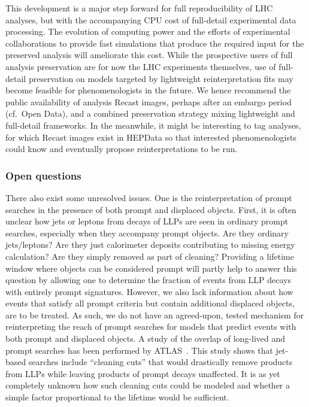 \documentclass[a4paper,aps,prd,longbibliography,notitlepage,showpacs,amsmath,amssymb,superscriptaddress,nofootinbib,floatfix,11pt,preprintnumbers]{revtex4-1-mod}
\newcommand{\hepdata}{\textsf{HEPData}\xspace}
\newcommand{\recast}{\textsf{Recast}\xspace}
\newcommand{\cf}{cf.\xspace}
\begin{document}
This development is a major step forward for full reproducibility of LHC analyses, but with the accompanying CPU cost of full-detail experimental data processing. The evolution of computing power and the efforts of experimental collaborations to provide fast simulations that produce the required input for the preserved analysis will ameliorate this cost. While the prospective users of full analysis preservation are for now the LHC experiments themselves, use of full-detail preservation on models targeted by lightweight reinterpretation fits may become feasible for phenomenologists in the future. We hence recommend the public availability of analysis \recast images, perhaps after an embargo period (\cf~Open Data), and a combined preservation strategy mixing lightweight and full-detail frameworks.
In the meanwhile, it might be interesting to tag analyses, for which \recast images exist in \hepdata so that interested phenomenologists could know and eventually propose reinterpretations to be run.


\subsubsection{Open questions \label{sec:openquestions}}

There also exist some unresolved issues.
One is the reinterpretation of prompt searches in the presence of both prompt and displaced objects.
First, it is often unclear how jets or leptons from decays of LLPs are seen in ordinary prompt searches, especially when they accompany prompt objects. Are they ordinary jets/leptons? Are they just calorimeter deposits contributing to missing energy calculation? Are they simply removed as part of cleaning? Providing a lifetime window where objects can be considered prompt will  partly help to answer this question by allowing one to determine the fraction of events from LLP decays with entirely prompt signatures.
However, we also lack information about how events that satisfy all prompt criteria but contain additional displaced objects, are to be treated.
As such, we do not have an agreed-upon, tested mechanism for reinterpreting the reach of prompt searches for models that predict events with both prompt and displaced objects.  A study of the overlap of long-lived and prompt searches has been performed by ATLAS~\cite{Nelson:2633119, ATLAS-CONF-2018-003}.  This study shows that jet-based searches include ``cleaning cuts'' that would drastically remove products from LLPs while leaving products of prompt decays unaffected.  It is as yet completely unknown how such cleaning cuts could be modeled and whether a simple factor proportional to the lifetime would be sufficient.
\end{document}
